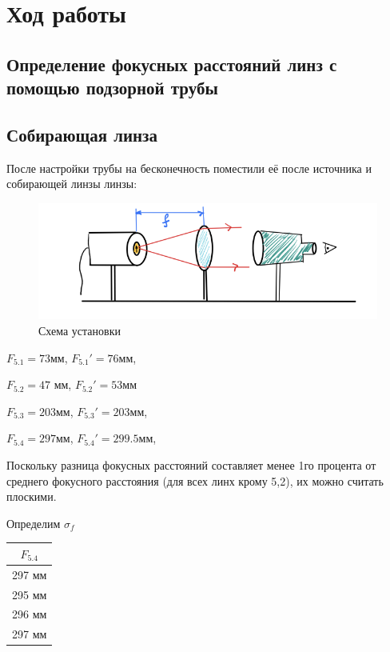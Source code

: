 \documentclass{article}
\begin{document}
\section{Ход работы}

\subsection*{Определение фокусных расстояний линз с помощью подзорной трубы}

\subsection*{Собирающая линза}

После настройки трубы на бесконечность поместили её после источника и собирающей линзы линзы:

\begin{figure}[h]
    \centering
    \includegraphics[scale=0.3]{2024-04-23.png}
    \caption{Схема установки}
\end{figure}

\begin{center}
    $F_{5.1} = 73мм$,  $F_{5.1}' = 76мм$, 

    $F_{5.2} = 47$ мм, $F_{5.2}' = 53мм$

    $F_{5.3} = 203мм$,  $F_{5.3}' = 203мм$, 

     $F_{5.4} = 297мм$,  $F_{5.4}' = 299.5мм$, 
\end{center}

Поскольку разница фокусных расстояний составляет менее 1го процента от среднего фокусного расстояния (для всех линх крому 5,2), их можно считать плоскими.

Определим $\sigma_f$

\begin{tabular}{|c|}
\hline
     $F_{5.4}$\\
     \hline
     297 мм \\
        \hline
     295 мм \\
        \hline
     296 мм \\
        \hline
     297 мм \\
     \hline
\end{tabular}
\end{document}
